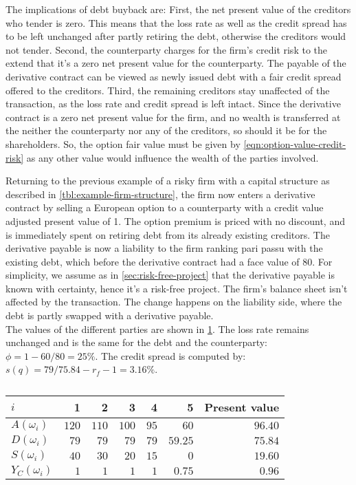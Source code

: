 \documentclass[../main.tex]{subfiles}
\begin{document}
            The implications of debt buyback are: First, the net present value of the creditors who tender is zero. This means that the loss rate as well as the credit spread has to be left unchanged after partly retiring the debt, otherwise the creditors would not tender. Second, the counterparty charges for the firm's credit risk to the extend that it's a zero net present value for the counterparty. The payable of the derivative contract can be viewed as newly issued debt with a fair credit spread offered to the creditors.
            Third, the remaining creditors stay unaffected of the transaction, as the loss rate and credit spread is left intact. Since the derivative contract is a zero net present value for the firm, and no wealth is transferred at the neither the counterparty nor any of the creditors, so should it be for the shareholders. So, the option fair value must be given by \cref{eqn:option-value-credit-risk} as any other value would influence the wealth of the parties involved.

            Returning to the previous example of a risky firm with a capital structure as described in \cref{tbl:example-firm-structure}, the firm now enters a derivative contract by selling a European option to a counterparty with a credit value adjusted present value of 1. The option premium is priced with no discount, and is immediately spent on retiring debt from its already existing creditors. The derivative payable is now a liability to the firm ranking pari passu with the existing debt, which before the derivative contract had a face value of 80. For simplicity, we assume as in \cref{sec:risk-free-project} that the derivative payable is known with certainty, hence it's a risk-free project. The firm's balance sheet isn't affected by the transaction. The change happens on the liability side, where the debt is partly swapped with a derivative payable.\\
            The values of the different parties are shown in \cref{tbl:example-debt-retiring}. The loss rate remains unchanged and is the same for the debt and the counterparty: $\phi=1-60/80=25\%$. The credit spread is computed by: $s(q)=79/75.84-r_{f}-1=3.16\%$.
            
            \begin{table}[h]
                \centering
                \begin{tabular}{l|rrrrr||r}
                    $i$ & 1 & 2 & 3 & 4 & 5 & Present value \\
                    \hline
                    $A(\omega_{i})$ & $120$ & $110$ & $100$ & $95$ & $60$ & $96.40$ \\
                    $D(\omega_{i})$ & $79$ & $79$ & $79$ & $79$ & $59.25$ & $75.84$ \\
                    $S(\omega_{i})$ & $40$ & $30$ & $20$ & $15$ & $0$ & $19.60$ \\
                    $Y_C(\omega_{i})$ & $1$ & $1$ & $1$ & $1$ & $0.75$ & $0.96$ \\
                \end{tabular}
                \caption{}
                \label{tbl:example-debt-retiring}
            \end{table}
\end{document}
